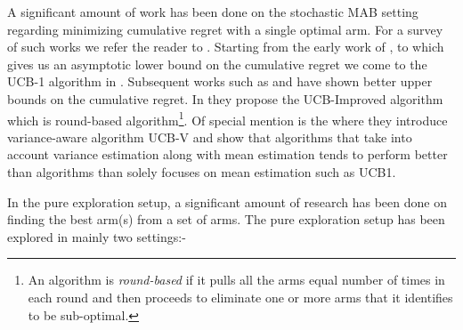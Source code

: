 A significant amount of work has been done on the stochastic MAB setting regarding minimizing cumulative regret with a single optimal arm. For a survey of such works we refer the reader to \cite{bubeck2012regret}. Starting from the early work of \cite{thompson1933likelihood}, \cite{robbins1952some} to \cite{lai1985asymptotically} which gives us an asymptotic lower bound on the cumulative regret we come to the UCB-1 algorithm in  \cite{auer2002finite}. Subsequent works such as \cite{audibert2009minimax} and \cite{auer2010ucb} have shown better upper bounds on the cumulative regret. In \cite{auer2010ucb} they propose the UCB-Improved algorithm which is round-based algorithm\footnote{An algorithm is \textit{round-based} if it pulls all the arms equal number of times in each round and then proceeds to eliminate one or more arms that it identifies to be sub-optimal.}. Of special mention is the \cite{audibert2009exploration} where they introduce variance-aware algorithm UCB-V and show that algorithms that take into account variance estimation along with mean estimation tends to perform better than algorithms than solely focuses on mean estimation such as UCB1.


	
	In the pure exploration setup, a significant amount of research has been done on finding the best arm(s) from a set of arms. The pure exploration setup has been explored in mainly two settings:-
	
